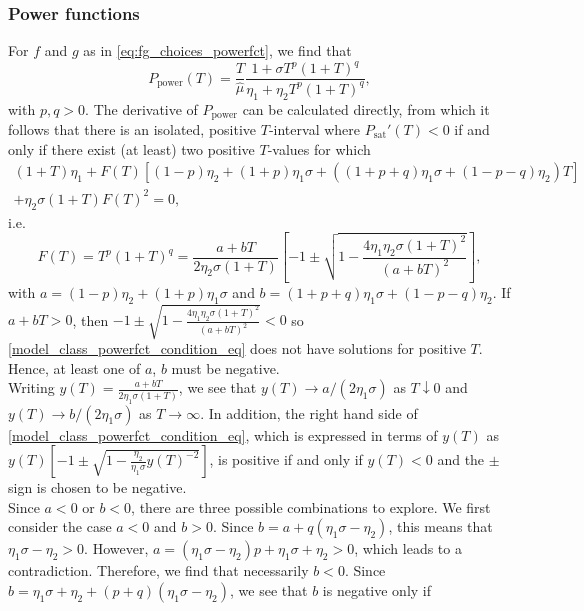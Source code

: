 \documentclass[a4paper,10pt,abstract=true,parskip=true]{scrartcl}
\theoremstyle{remark}
\numberwithin{equation}{section}
\numberwithin{thm}{section}
\begin{document}
\subsubsection{Power functions} For $f$ and $g$ as in \eqref{eq:fg_choices_powerfct}, we find that 
\begin{equation}\label{eq:PpowerT}
    P_\text{power}(T) = \frac{T}{\hat{\mu}} \frac{1+\sigma T^p(1+T)^q}{\eta_1 + \eta_2 T^p (1+T)^q},
\end{equation}
 with $p,q > 0$.
 The derivative of $P_\text{power}$ can be calculated directly, from which it follows that there is an isolated, positive $T$-interval where $P_\text{sat}'(T) <0$ if and only if there exist (at least) two positive $T$-values for which
\begin{align*}
 (1+T) \eta_1 + F(T)\left[(1-p)\eta_2 + (1+p)\eta_1 \sigma + \left((1+p+q)\eta_1 \sigma +(1-p-q)\eta_2\right)T\right]\\ + \eta_2 \sigma (1+T) F(T)^2 = 0,
\end{align*}
i.e.
\begin{equation}\label{model_class_powerfct_condition_eq}
 F(T) = T^p (1+T)^q  = \frac{a + b T}{2 \eta_2 \sigma (1+T)}\left[-1 \pm \sqrt{1-\frac{4\eta_1 \eta_2 \sigma(1+T)^2}{(a+b T)^2} }\right],
\end{equation}
with $a = (1-p)\eta_2 + (1+p)\eta_1 \sigma$ and $b=(1+p+q)\eta_1 \sigma +(1-p-q)\eta_2$. If $a+b T > 0$, then $-1 \pm \sqrt{1-\frac{4\eta_1 \eta_2 \sigma(1+T)^2}{(a+b T)^2} }<0$ so \eqref{model_class_powerfct_condition_eq} does not have solutions for positive $T$. Hence, at least one of $a$, $b$ must be negative.\\
Writing $y(T) = \frac{a + b T}{2 \eta_1 \sigma(1+T)}$, we see that $y(T) \to a/(2 \eta_1 \sigma)$ as $T \downarrow 0$ and $y(T) \to b/(2\eta_1 \sigma)$ as $T \to \infty$. In addition, the right hand side of \eqref{model_class_powerfct_condition_eq}, which is expressed in terms of $y(T)$ as $y(T) \left[-1 \pm \sqrt{1-\frac{\eta_2}{\eta_1 \sigma} y(T)^{-2}}\right]$, is positive if and only if $y(T)<0$ and the $\pm$ sign is chosen to be negative.\\
Since $a<0$ or $b<0$, there are three possible combinations to explore. We first consider the case $a<0$ and $b>0$. Since $b = a + q(\eta_1 \sigma - \eta_2)$, this means that $\eta_1 \sigma - \eta_2 > 0$. However, $a = (\eta_1 \sigma -\eta_2 )p + \eta_1 \sigma + \eta_2 > 0$, which leads to a contradiction. Therefore, we find that necessarily $b<0$. Since $b = \eta_1 \sigma + \eta_2 + (p+q)(\eta_1 \sigma - \eta_2)$, we see that $b$ is negative only if 
\end{document}
